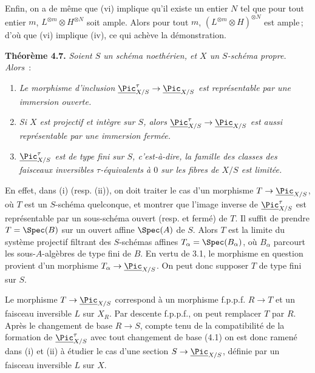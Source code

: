 Enfin, on a de m\^eme que (vi) implique qu'il existe un entier \(N\) tel que pour tout entier \(m\), \(L^{\otimes m}\otimes H^{\otimes N}\) soit ample. Alors pour tout \(m\), \((L^{\otimes m}\otimes H)^{\otimes N}\) est ample\,; d'o\`u que (vi) implique (iv), ce qui ach\`eve la d\'emonstration.

\textbf{Th\'eor\`eme 4.7.} \emph{Soient \(S\) un sch\'ema noeth\'erien, et \(X\) un \(S\)-sch\'ema propre. Alors}~:
\begin{enumerate}[label=(\roman*)]
\item \emph{Le morphisme d'inclusion \(\underline{\Pic}^\tau_{X/S}\to\underline{\Pic}_{X/S}\) est repr\'esentable par une immersion ouverte.}
\item
\emph{Si \(X\) est projectif et int\`egre sur \(S\), alors \(\underline{\Pic}^\tau_{X/S}\to\underline{\Pic}_{X/S}\) est aussi repr\'esentable par une immersion ferm\'ee.}
\item \emph{\(\underline{\Pic}^\tau_{X/S}\) est de type fini sur \(S\), c'est-\`a-dire, la famille des classes des faisceaux inversibles \(\tau\)-\'equivalents \`a \(0\) sur les fibres de \(X/S\) est limit\'ee.}
\end{enumerate}

En effet, dans (i) (resp. (ii)), on doit traiter le cas d'un morphisme \(T\to\underline{\Pic}_{X/S}\), o\`u \(T\) est un \(S\)-sch\'ema quelconque, et montrer que l'image inverse de \(\underline{\Pic}^\tau_{X/S}\) est repr\'esentable par un sous-sch\'ema ouvert (resp. et ferm\'e) de \(T\). Il suffit de prendre \(T=\Spec(B)\) sur un ouvert affine \(\Spec(A)\) de \(S\). Alors \(T\) est la limite du syst\`eme projectif filtrant des \(S\)-sch\'emas affines \(T_\alpha=\Spec(B_\alpha)\), o\`u \(B_\alpha\) parcourt les sous-\(A\)-alg\`ebres de type fini de \(B\). En vertu de 3.1, le morphisme en question provient d'un morphisme \(T_\alpha\to\underline{\Pic}_{X/S}\). On peut donc supposer \(T\) de type fini sur \(S\).

Le morphisme \(T\to\underline{\Pic}_{X/S}\) correspond \`a un morphisme f.p.p.f. \(R\to T\) et un faisceau inversible \(L\) sur \(X_R\). Par descente f.p.p.f., on peut remplacer \(T\) par \(R\). Apr\`es le changement de base \(R\to S\), compte tenu de la compatibilit\'e de la formation de \(\underline{\Pic}^\tau_{X/S}\) avec tout changement de base (4.1) on est donc ramen\'e dans (i) et (ii) \`a \'etudier le cas d'une section \(S\to\underline{\Pic}_{X/S}\), d\'efinie par un faisceau inversible \(L\) sur \(X\).


